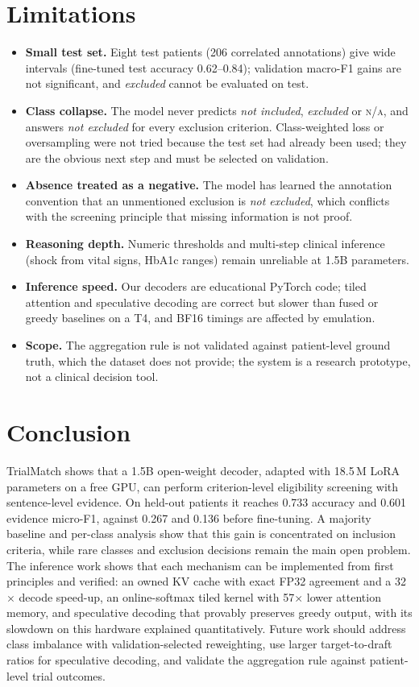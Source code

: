 \documentclass[conference]{IEEEtran}
\newcommand{\NA}{\textsc{n/a}}
\begin{document}
\section{Limitations}
\begin{itemize}
\item \textbf{Small test set.} Eight test patients (206 correlated annotations) give wide intervals (fine-tuned test accuracy 0.62--0.84); validation macro-F1 gains are not significant, and \emph{excluded} cannot be evaluated on test.
\item \textbf{Class collapse.} The model never predicts \emph{not included}, \emph{excluded} or \NA, and answers \emph{not excluded} for every exclusion criterion. Class-weighted loss or oversampling were not tried because the test set had already been used; they are the obvious next step and must be selected on validation.
\item \textbf{Absence treated as a negative.} The model has learned the annotation convention that an unmentioned exclusion is \emph{not excluded}, which conflicts with the screening principle that missing information is not proof.
\item \textbf{Reasoning depth.} Numeric thresholds and multi-step clinical inference (shock from vital signs, HbA1c ranges) remain unreliable at 1.5B parameters.
\item \textbf{Inference speed.} Our decoders are educational PyTorch code; tiled attention and speculative decoding are correct but slower than fused or greedy baselines on a T4, and BF16 timings are affected by emulation.
\item \textbf{Scope.} The aggregation rule is not validated against patient-level ground truth, which the dataset does not provide; the system is a research prototype, not a clinical decision tool.
\end{itemize}

\section{Conclusion}
TrialMatch shows that a 1.5B open-weight decoder, adapted with 18.5\,M LoRA parameters on a free GPU, can perform criterion-level eligibility screening with sentence-level evidence. On held-out patients it reaches 0.733 accuracy and 0.601 evidence micro-F1, against 0.267 and 0.136 before fine-tuning. A majority baseline and per-class analysis show that this gain is concentrated on inclusion criteria, while rare classes and exclusion decisions remain the main open problem. The inference work shows that each mechanism can be implemented from first principles and verified: an owned KV cache with exact FP32 agreement and a 32$\times$ decode speed-up, an online-softmax tiled kernel with 57$\times$ lower attention memory, and speculative decoding that provably preserves greedy output, with its slowdown on this hardware explained quantitatively. Future work should address class imbalance with validation-selected reweighting, use larger target-to-draft ratios for speculative decoding, and validate the aggregation rule against patient-level trial outcomes.
\end{document}
